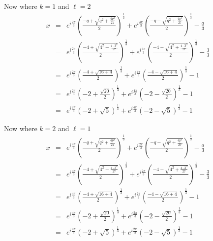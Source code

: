 \documentclass[10pt]{amsart}
\theoremstyle{nonumberplain}
\begin{document}
\begin{enumerate}[label={\bf {\arabic*}:}]
\begin{itemize}
Now where $k=1$ and $\ell=2$
\begin{eqnarray*}
x &=& e^{i\frac{2\pi}{3}} \left(\frac{-q + \sqrt{q^2 + \frac{4p^3}{27}}}{2}\right)^{\frac{1}{3}} + e^{i\frac{4\pi}{3}} \left(\frac{-q - \sqrt{q^2 + \frac{4p^3}{27}}}{2}\right)^{\frac{1}{3}} -\frac{a}{3} \\
   &=& e^{i\frac{2\pi}{3}} \left(\frac{-4 + \sqrt{4^2 + \frac{4 \cdot 3^3}{27}}}{2}\right)^{\frac{1}{3}} + e^{i\frac{4\pi}{3}} \left(\frac{-4 - \sqrt{4^2 + \frac{4 \cdot 3^3}{27}}}{2}\right)^{\frac{1}{3}} -\frac{3}{3} \\
   &=& e^{i\frac{2\pi}{3}} \left(\frac{-4 + \sqrt{16 + 4}}{2}\right)^{\frac{1}{3}} + e^{i\frac{4\pi}{3}} \left(\frac{-4 - \sqrt{16 + 4}}{2}\right)^{\frac{1}{3}} -1 \\
   &=& e^{i\frac{2\pi}{3}} \left( - 2 + \frac{\sqrt{20}}{2}\right)^{\frac{1}{3}} + e^{i\frac{4\pi}{3}} \left(- 2 - \frac{\sqrt{20}}{2}\right)^{\frac{1}{3}} -1 \\
   &=& e^{i\frac{2\pi}{3}} \left( - 2 + \sqrt{5}\right)^{\frac{1}{3}} + e^{i\frac{4\pi}{3}} \left(- 2 - \sqrt{5}\right)^{\frac{1}{3}} -1
\end{eqnarray*}

Now where $k=2$ and $\ell=1$
\begin{eqnarray*}
x &=& e^{i\frac{4\pi}{3}} \left(\frac{-q + \sqrt{q^2 + \frac{4p^3}{27}}}{2}\right)^{\frac{1}{3}} + e^{i\frac{2\pi}{3}} \left(\frac{-q - \sqrt{q^2 + \frac{4p^3}{27}}}{2}\right)^{\frac{1}{3}} -\frac{a}{3} \\
   &=& e^{i\frac{4\pi}{3}} \left(\frac{-4 + \sqrt{4^2 + \frac{4 \cdot 3^3}{27}}}{2}\right)^{\frac{1}{3}} + e^{i\frac{2\pi}{3}} \left(\frac{-4 - \sqrt{4^2 + \frac{4 \cdot 3^3}{27}}}{2}\right)^{\frac{1}{3}} -\frac{3}{3} \\
   &=& e^{i\frac{4\pi}{3}} \left(\frac{-4 + \sqrt{16 + 4}}{2}\right)^{\frac{1}{3}} + e^{i\frac{2\pi}{3}} \left(\frac{-4 - \sqrt{16 + 4}}{2}\right)^{\frac{1}{3}} -1 \\
   &=& e^{i\frac{4\pi}{3}} \left( - 2 + \frac{\sqrt{20}}{2}\right)^{\frac{1}{3}} + e^{i\frac{2\pi}{3}} \left(- 2 - \frac{\sqrt{20}}{2}\right)^{\frac{1}{3}} -1 \\
   &=& e^{i\frac{4\pi}{3}} \left( - 2 + \sqrt{5}\right)^{\frac{1}{3}} + e^{i\frac{2\pi}{3}} \left(- 2 - \sqrt{5}\right)^{\frac{1}{3}} -1
\end{eqnarray*}



\end{itemize}
\end{enumerate}
\end{document}

